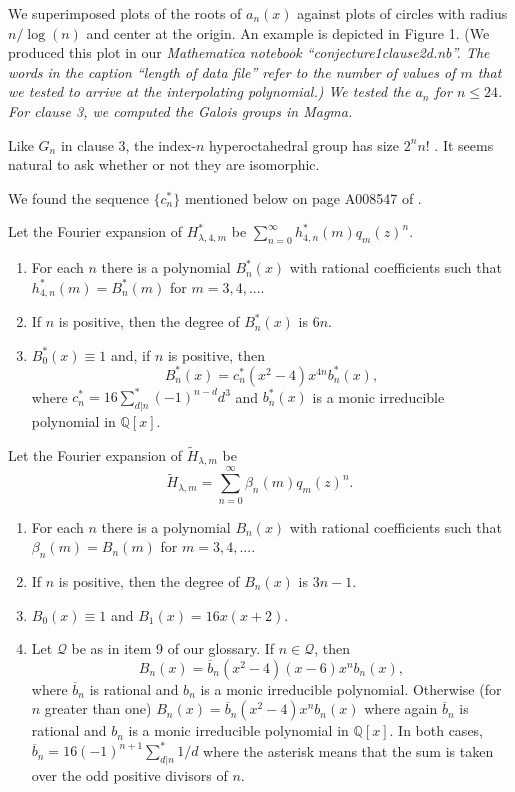 \documentclass{article}
\begin{document}
%
%
We superimposed plots of the roots
of $a_n(x)$ against plots of circles with 
radius $n/\log (n)$
and center at the origin. An example is 
depicted in Figure 1.
(We produced this
plot in our \it Mathematica \rm notebook
``conjecture1clause2d.nb''.
The words in the caption
``length of data file'' refer to the number of
values of $m$ that we tested to arrive at the interpolating
polynomial.)
We tested the $a_n$
for $n  \leq 24$.
For clause 3, we computed the Galois groups in \it Magma\rm.
\begin{remark}
Like $G_n$ in clause 3, 
the index-$n$ hyperoctahedral group
has size $2^n n!$
\cite{hyper,miller1918groups,graczyk2005hyper}.
It seems natural to ask
whether or not they are isomorphic.
\end{remark} 
\noindent
We found the sequence
$\{c^*_n\}$ mentioned below on page A008547 of \cite{OEIS}.
\begin{conjecture}
Let the Fourier expansion of 
$H^*_{\lambda,4,m}$ be
$\sum_{n=0}^{\infty} h^*_{4,n}(m) q_m(z)^n$.
\begin{enumerate}
\item For each $n$ there is a polynomial
$B^*_n(x)$ with rational coefficients
such that 
$h^*_{4,n}(m)=B^*_n(m)$ for  $m = 3,4, ....$
\item If $n$ is positive, then the degree
of $B^*_n(x)$ is $6n$.
\item $B^*_0(x) \equiv 1$ and,
if $n$ is positive, then 
$$
B^*_n(x) = 
c^*_n  (x^2-4)x^{4n}  b^*_n(x),
$$
where $c^*_n = 16 \sum^*_{d|n} (-1)^{n-d} d^3$
and $b^*_n(x)$ is a monic irreducible polynomial
in $\mathbb{Q}[x]$.
\end{enumerate}
\end{conjecture}
\begin{conjecture}
Let the Fourier expansion of 
$\widetilde{H}_{\lambda,m}$ be
$$
\widetilde{H}_{\lambda,m} =
\sum_{n=0}^{\infty} \beta_n(m) q_m(z)^n.
$$
\begin{enumerate}
\item For each $n$ there is a polynomial
$B_n(x)$ with rational coefficients
such that 
$\beta_n(m)=B_n(m)$ for  $m = 3,4, ....$
\item If $n$ is positive, then the degree
of $B_n(x)$ is $3n - 1$.
\item $B_0(x) \equiv 1$ and $B_1(x)  = 16x(x+2)$.
\item Let  $\mathscr{Q}$ be as in item 9 of
our glossary.
If $n \in \mathscr{Q}$, then 
$$
B_n(x) = 
\overline{b}_n  (x^2-4)(x-6)x^n  b_n(x),
$$
where $\overline{b}_n$ is rational
and $b_n$ is a monic irreducible polynomial.
Otherwise (for $n$ greater than one)
$B_n(x) =  \overline{b}_n (x^2-4)x^n  b_n(x)$
where again  $\overline{b}_n$ is rational and
$b_n$ is a monic irreducible 
polynomial in $\mathbb{Q}[x]$. In both cases,
$\overline{b}_n = 16 (-1)^{n+1} \sum^*_{d|n} 1/d$
where the asterisk means that the sum is taken 
over the odd positive divisors of $n$.
\end{enumerate}
\end{conjecture}
\end{document}
